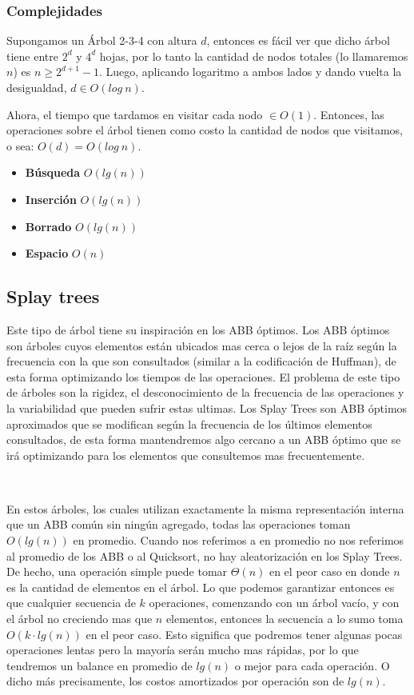 \subsubsection{Complejidades}

Supongamos un \'Arbol 2-3-4 con altura $d$, entonces es f\'acil ver que dicho \'arbol tiene entre $2^d$ y $4^d$ hojas, por lo tanto la cantidad de nodos totales (lo llamaremos $n$) es $n \geq 2^{d+1} -1$.
Luego, aplicando logaritmo a ambos lados y dando vuelta la desigualdad, $d \in O(log\ n)$.

Ahora, el tiempo que tardamos en visitar cada nodo $\in O(1)$. Entonces, las operaciones sobre el \'arbol tienen como costo la cantidad de nodos que visitamos, o sea: $O(d) = O(log\ n)$.

\begin{itemize}
 \item \textbf{B\'usqueda} $O(lg(n))$
 \item \textbf{Inserci\'on} $O(lg(n))$
 \item \textbf{Borrado} $O(lg(n))$
 \item \textbf{Espacio} $O(n)$
\end{itemize}

\subsection{Splay trees}

Este tipo de \'arbol tiene su inspiraci\'on en los ABB \'optimos. Los ABB \'optimos son \'arboles cuyos elementos est\'an ubicados mas cerca o lejos de la ra\'iz seg\'un la frecuencia con la que son consultados (similar a la codificaci\'on de Huffman), de esta forma optimizando los tiempos de las operaciones. El problema de este tipo de \'arboles son la rigidez, el desconocimiento de la frecuencia de las operaciones y la variabilidad que pueden sufrir estas ultimas. Los Splay Trees son ABB \'optimos aproximados que se modifican seg\'un la frecuencia de los \'ultimos elementos consultados, de esta forma mantendremos algo cercano a un ABB \'optimo que se ir\'a optimizando para los elementos que consultemos mas frecuentemente.

~

En estos \'arboles, los cuales utilizan exactamente la misma representaci\'on interna que un ABB com\'un sin ning\'un agregado, todas las operaciones toman $O(lg(n))$ en promedio. Cuando nos referimos a en promedio no nos referimos al promedio de los ABB o al Quicksort, no hay aleatorizaci\'on en los Splay Trees. De hecho, una operaci\'on simple puede tomar $\Theta(n)$ en el peor caso en donde $n$ es la cantidad de elementos en el \'arbol. Lo que podemos garantizar entonces es que cualquier secuencia de $k$ operaciones, comenzando con un \'arbol vac\'io, y con el \'arbol no creciendo mas que $n$ elementos, entonces la secuencia a lo sumo toma $O(k\cdot lg(n))$ en el peor caso. Esto significa que podremos tener algunas pocas operaciones lentas pero la mayor\'ia ser\'an mucho mas r\'apidas, por lo que tendremos un balance en promedio de $lg(n)$ o mejor para cada operaci\'on. O dicho m\'as precisamente, los costos amortizados por operaci\'on son de $lg(n)$.

